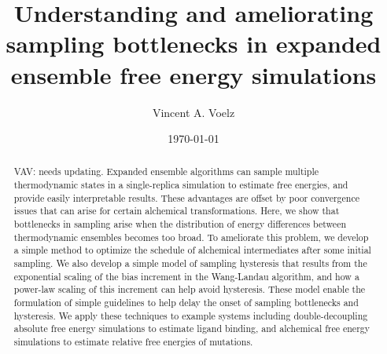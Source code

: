 \documentclass[%
 aip,
rsi,%
 amsmath,amssymb,
 reprint,%
]{revtex4-1}
\begin{document}

\title[Convergence in expanded ensemble simulations]{Understanding and ameliorating sampling bottlenecks in expanded ensemble free energy simulations}%




\author{Vincent A. Voelz}


\date{\today}%

\begin{abstract}
\color{red}VAV: needs  updating. Expanded ensemble algorithms can sample multiple thermodynamic states in a single-replica simulation to estimate free energies, and provide easily interpretable results.  These advantages are offset by poor convergence issues that can arise for certain alchemical transformations.  Here, we show that bottlenecks in sampling arise when the distribution of energy differences between thermodynamic ensembles becomes too broad.  To ameliorate this problem, we develop a simple method to optimize the schedule of alchemical intermediates after some initial sampling.  We also develop a simple model of sampling hysteresis that results from the exponential scaling of the bias increment in the Wang-Landau algorithm, and how a power-law scaling of this increment can help avoid hysteresis.   These model enable the formulation of simple guidelines to help delay the onset of sampling bottlenecks and hysteresis.  We apply these techniques to example systems including  double-decoupling absolute free energy simulations to estimate ligand binding, and alchemical free energy simulations to estimate relative free energies of mutations.\color{black}
\end{abstract}
\end{document}
